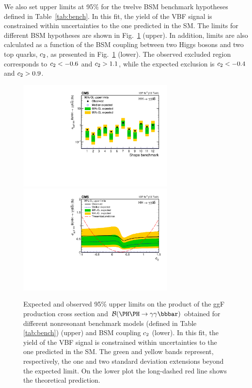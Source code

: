 \documentclass[11pt,twoside,a4paper,cmspaper,final,collab]{cms-tdr}
\begin{document}
We also set upper limits at 95\% \CL for the twelve BSM benchmark hypotheses defined in Table~\ref{tab:bench}. In this fit, the yield of the VBF \HH signal is constrained within uncertainties to the one predicted in the SM. The limits for different BSM hypotheses are shown in Fig.~\ref{fig:klambdascan_bench} (upper). In addition, limits are also calculated as a function of the BSM coupling between two Higgs bosons and two top quarks, $c_2$, as presented in Fig.~\ref{fig:klambdascan_bench} (lower). The observed excluded region corresponds to $c_2 < -0.6$ and $c_2 > 1.1$, while the expected exclusion is $c_2 < -0.4$ and $c_2 > 0.9$.


\begin{figure}[!ht]
  \centering
\includegraphics[width=0.7\textwidth]{Figure_016-a.pdf}\hfil \\
\includegraphics[width=0.7\textwidth]{Figure_016-b.pdf}\hfil 
  \caption{Expected and observed 95\% \CL upper limits on the product of the ggF \HH production cross section and $\mathcal{B}(\HH\to\bbgg)$ obtained for different nonresonant benchmark models (defined in Table \ref{tab:bench}) (upper) and BSM coupling $c_2$ (lower). In this fit, the yield of the VBF \HH signal is constrained within uncertainties to the one predicted in the SM. The green and yellow bands represent, respectively, the one and two standard deviation extensions beyond the expected limit. On the lower plot the long-dashed red line shows the theoretical prediction.
}
  \label{fig:klambdascan_bench}
\end{figure}
\end{document}
